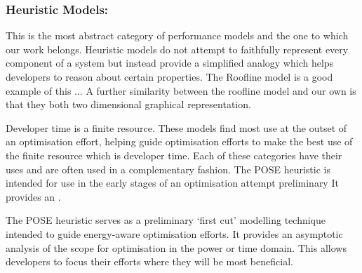 \subsubsection{Heuristic Models:}
This is the most abstract category of performance models and the one to which our work belongs.
Heuristic models do not attempt to faithfully represent every component of a system but instead provide a simplified analogy which helps developers to reason about certain properties.
The Roofline model \cite{williams:2009aa} is a good example of this ...
A further similarity between the roofline model and our own is that they both two dimensional graphical representation.

Developer time is a finite resource. These models find most use at the outset of an optimisation effort, helping guide optimisation efforts to make the best use of the finite resource which is developer time.
Each of these categories have their uses and are often used in a complementary fashion.
The POSE heuristic is intended for use in the early stages of an optimisation attempt preliminary 
It provides an .

The POSE heuristic serves as a preliminary `first cut' modelling technique intended to guide energy-aware optimisation efforts.
It provides an asymptotic analysis of the scope for optimisation in the power or time domain.
This allows developers to focus their efforts where they will be most beneficial.

